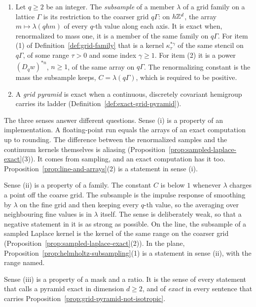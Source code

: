 \begin{definition}
\begin{enumerate}
\item Let $q \ge 2$ be an integer. The \emph{subsample} of a member $\lambda$ of a grid family on
a lattice $\Gamma$ is its restriction to the coarser grid $q\Gamma$: on $h\mathbb{Z}^d$, the array
$m \mapsto \lambda(qhm)$ of every $q$-th value along each axis. It is exact when, renormalized to
mass one, it is a member of the same family on $q\Gamma$. For item (1) of
Definition~\ref{def:grid-family} that is a kernel $\kappa_\tau^{*\gamma}$ of the same stencil on
$q\Gamma$, of some range $\tau > 0$ and some index $\gamma \ge 1$. For item (2) it is a power
$(D_qw)^{*n}$, $n \ge 1$, of the same array on $q\Gamma$. The renormalizing constant is the mass
the subsample keeps, $C = \lambda(q\Gamma)$, which is required to be positive.
\item A \emph{grid pyramid} is exact when a continuous, discretely covariant hemigroup carries its
ladder (Definition~\ref{def:exact-grid-pyramid}).
\end{enumerate}
\statusT
\end{definition}

The three senses answer different questions. Sense (i) is a property of an implementation. A
floating-point run equals the arrays of an exact computation up to rounding. The difference between
the renormalized samples and the continuum kernels themselves is aliasing
(Proposition~\ref{prop:sampled-laplace-exact}(3)). It comes from sampling, and an exact computation
has it too. Proposition~\ref{prop:line-and-arrays}(2) is a statement in sense (i).

Sense (ii) is a property of a family. The constant $C$ is below $1$ whenever $\lambda$ charges a
point off the coarse grid. The subsample is the impulse response of smoothing by $\lambda$ on the
fine grid and then keeping every $q$-th value, so the averaging over neighbouring fine values is in
$\lambda$ itself. The sense is deliberately weak, so that a negative statement in it is as strong as
possible. On the line, the subsample of a sampled Laplace kernel is the kernel of the same range on
the coarser grid (Proposition~\ref{prop:sampled-laplace-exact}(2)). In the plane,
Proposition~\ref{prop:helmholtz-subsampling}(1) is a statement in sense (ii), with the range named.

Sense (iii) is a property of a mask and a ratio. It is the sense of every statement that calls a
pyramid exact in dimension $d \ge 2$, and of \emph{exact} in every sentence that carries
Proposition~\ref{prop:grid-pyramid-not-isotropic}.

